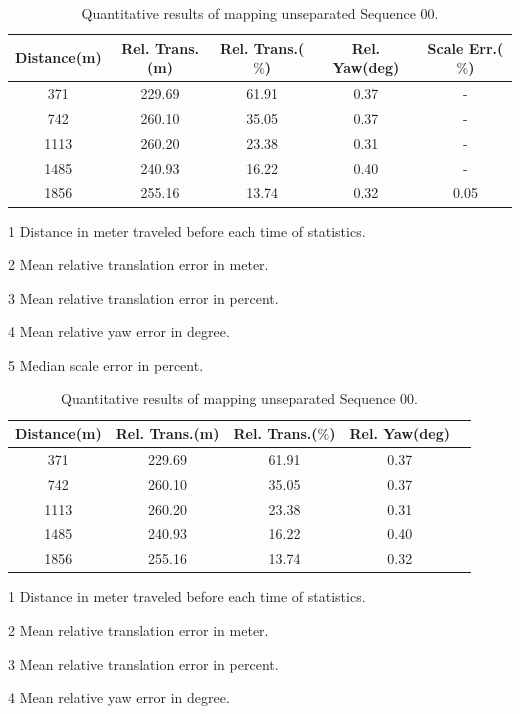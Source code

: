 \begin{table}
	\centering
	\caption{Quantitative results of mapping unseparated Sequence 00.}
	\begin{threeparttable}
			\ifoutputscaleerror
		\begin{tabular}{|c|c|c|c|c|}
			\hline
			Distance(m)\tnote{1} & Rel. Trans.(m)\tnote{2}  & Rel. Trans.($\%$)\tnote{3} & Rel. Yaw(deg)\tnote{4} & Scale Err.($\%$)\tnote{5}  \\
			\hline
			371& 229.69 & 61.91 & 0.37 & - \\
			\hline
			742&260.10& 35.05 & 0.37 & - \\
			\hline
			1113&260.20& 23.38 & 0.31 & - \\
			\hline
			1485&240.93& 16.22 & 0.40 & - \\
			\hline
			1856&255.16& 13.74 & 0.32 & 0.05\\
			\hline
		\end{tabular}
		\begin{tablenotes}
			\footnotesize
			\item[1] Distance in meter traveled before each time of statistics. 
			\item[2] Mean relative translation error in meter.
			\item[3] Mean relative translation error in percent.
			\item[4] Mean relative yaw error in degree.
			\item[5] Median scale error in percent.
		\end{tablenotes}
	\fi
	
			\begin{tabular}{|c|c|c|c|c|}
		\hline
		Distance(m)\tnote{1} & Rel. Trans.(m)\tnote{2}  & Rel. Trans.($\%$)\tnote{3} & Rel. Yaw(deg)\tnote{4}   \\
		\hline
		371& 229.69 & 61.91 & 0.37  \\
		\hline
		742&260.10& 35.05 & 0.37 \\
		\hline
		1113&260.20& 23.38 & 0.31  \\
		\hline
		1485&240.93& 16.22 & 0.40 \\
		\hline
		1856&255.16& 13.74 & 0.32 \\
		\hline
	\end{tabular}
	\begin{tablenotes}
		\footnotesize
		\item[1] Distance in meter traveled before each time of statistics. 
		\item[2] Mean relative translation error in meter.
		\item[3] Mean relative translation error in percent.
		\item[4] Mean relative yaw error in degree.
	\end{tablenotes}
	\end{threeparttable}
	\label{tbl:kitticlientquanresult}
\end{table}


